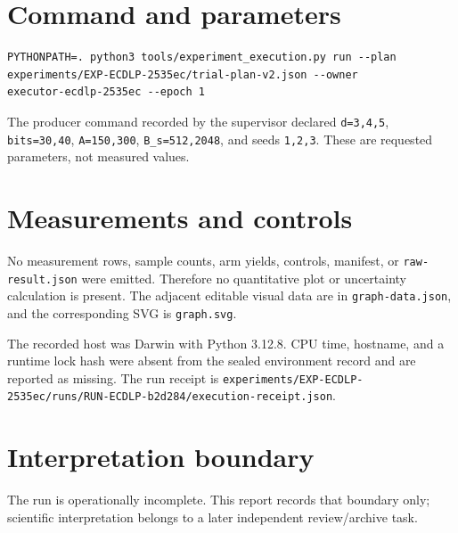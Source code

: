 \documentclass[11pt]{article}
\newcommand{\code}[1]{\texttt{\small #1}}
\begin{document}
\section*{Command and parameters}
\begin{Verbatim}[fontsize=\scriptsize]
PYTHONPATH=. python3 tools/experiment_execution.py run --plan
experiments/EXP-ECDLP-2535ec/trial-plan-v2.json --owner
executor-ecdlp-2535ec --epoch 1
\end{Verbatim}
The producer command recorded by the supervisor declared
\code{d={3,4,5}}, \code{bits={30,40}}, \code{A={150,300}},
\code{B_s={512,2048}}, and seeds \code{{1,2,3}}. These are requested
parameters, not measured values.

\section*{Measurements and controls}
No measurement rows, sample counts, arm yields, controls, manifest, or
\code{raw-result.json} were emitted. Therefore no quantitative plot or
uncertainty calculation is present. The adjacent editable visual data are in
\code{graph-data.json}, and the corresponding SVG is \code{graph.svg}.

The recorded host was Darwin with Python 3.12.8. CPU time, hostname, and a
runtime lock hash were absent from the sealed environment record and are
reported as missing. The run receipt is
\code{experiments/EXP-ECDLP-2535ec/runs/RUN-ECDLP-b2d284/execution-receipt.json}.

\section*{Interpretation boundary}
The run is operationally incomplete. This report records that boundary only;
scientific interpretation belongs to a later independent review/archive task.
\end{document}
